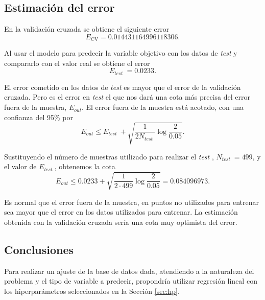 \documentclass[a4paper, 20pt]{article}
\newcommand{\test}{\textit{test }}
\begin{document}
\subsection{Estimación del error}
En la validación cruzada se obtiene el siguiente error\[
E_{\text{CV}} = 0.014431164996118306.\]

Al usar el modelo para predecir la variable objetivo con los datos de \test y compararlo con el valor real se obtiene el error\[
E_{\test} = 0.0233.
\]

El error cometido en los datos de \test es mayor que el error de la validación cruzada. Pero es el error en \test el que nos dará una cota más precisa del error fuera de la muestra, $E_{\textit{out}}$. El error fuera de la muestra está acotado, con una confianza del 95\% por\[
E_{out}\leq E_{\test} + \sqrt{\frac{1}{2N_{\test}} \log \frac{2}{0.05}}.
  \]

  Sustituyendo el número de muestras utilizado para realizar el \test, $N_{\test} = 499$, y el valor de $E_{\test}$, obtenemos la cota\[
E_{out}\leq 0.0233 + \sqrt{\frac{1}{2\cdot 499} \log \frac{2}{0.05}} = 0.084096973.
\]

Es normal que el error fuera de la muestra, en puntos no utilizados para entrenar sea mayor que el error en los datos utilizados para entrenar. La estimación obtenida con la validación cruzada sería una cota muy optimista del error.

\subsection{Conclusiones}
Para realizar un ajuste de la base de datos dada, atendiendo a la naturaleza del problema y el tipo de variable a predecir, propondría utilizar regresión lineal con los hiperparámetros seleccionados en la Sección \ref{sec:hp}.\\
\end{document}
